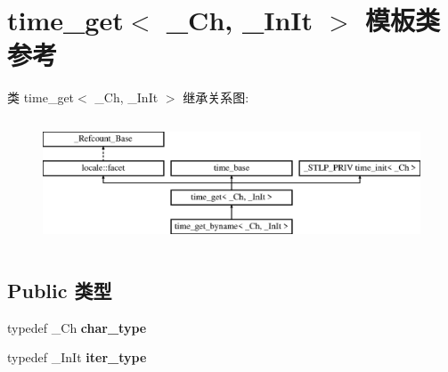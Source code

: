 \hypertarget{classtime__get}{}\section{time\+\_\+get$<$ \+\_\+\+Ch, \+\_\+\+In\+It $>$ 模板类 参考}
\label{classtime__get}
类 time\+\_\+get$<$ \+\_\+\+Ch, \+\_\+\+In\+It $>$ 继承关系图\+:\begin{figure}[H]
\begin{center}
\leavevmode
\includegraphics[height=3.809524cm]{classtime__get}
\end{center}
\end{figure}
\subsection*{Public 类型}
\begin{DoxyCompactItemize}
\item 
\mbox{\label{classtime__get_adc3c6abeb47f369e11611797f2c4da17}} 
typedef \+\_\+\+Ch {\bfseries char\+\_\+type}
\item 
\mbox{\label{classtime__get_abbb173c782aa57a4e51c0416d93f7928}} 
typedef \+\_\+\+In\+It {\bfseries iter\+\_\+type}
\end{DoxyCompactItemize}
